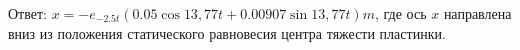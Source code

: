 Ответ: $x=-e_{-2.5t}(0.05\cos13,77t+0.00907\sin13,77t) m$, где ось $x$
направлена вниз из положения статического равновесия центра тяжести пластинки.